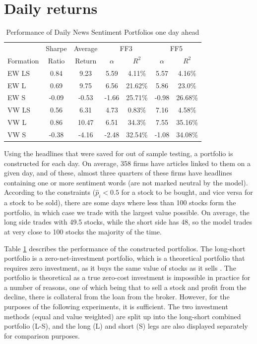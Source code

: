 \section{Daily returns}
\label{sec:daily-returns-analysis}

\begin{table}[!ht]
\begin{center}
\begin{tabular}{lcccccc}
      \toprule
      & Sharpe &  Average & \multicolumn{2}{c}{FF3} & \multicolumn{2}{c}{FF5} \\
      \cmidrule(lr){4-5}
      \cmidrule(lr){6-7}
      Formation & Ratio & Return & $\alpha$ & $R^2$ & $\alpha$ & $R^2$ \\
      \midrule
      EW LS & 0.84 & 9.23 & 5.59 & 4.11\% & 5.57 & 4.16\% \\
      EW L & 0.69 & 9.75 & 6.56 & 21.62\% & 5.86 & 23.0\% \\
      EW S & -0.09 & -0.53 & -1.66 & 25.71\% & -0.98 & 26.68\% \\
      VW LS & 0.56 & 6.31 & 4.73 & 0.83\% & 7.16 & 4.58\% \\
      VW L & 0.86 & 10.47 & 6.51 & 34.3\% & 7.55 & 35.16\% \\
      VW S & -0.38 & -4.16 & -2.48 & 32.54\% & -1.08 & 34.08\% \\
      \bottomrule
\end{tabular}
\caption{Performance of Daily News Sentiment Portfolios one day ahead}
\label{portfolio-performance}
\end{center}
\end{table}

Using the headlines that were saved for out of sample testing, a portfolio is constructed for each day. On average, 358 firms have articles linked to them on a given day, and of these, almost three quarters of these firms have headlines containing one or more sentiment words (are not marked neutral by the model). According to the constraints ($\widehat p_i < 0.5$ for a stock to be bought, and vice versa for a stock to be sold), there are some days where less than 100 stocks form the portfolio, in which case we trade with the largest value possible. On average, the long side trades with 49.5 stocks, while the short side has 48, so the model trades at very close to 100 stocks the majority of the time.

Table \ref{portfolio-performance} describes the performance of the constructed portfolios. The long-short portfolio is a zero-net-investment portfolio, which is a theoretical portfolio that requires zero investment, as it buys the same value of stocks as it sells \parencite{zero-net}. The portfolio is theoretical as a true zero-cost investment is impossible in practice for a number of reasons, one of which being that to sell a stock and profit from the decline, there is collateral from the loan from the broker. However, for the purposes of the following experiments, it is sufficient. The two investment methods (equal and value weighted) are split up into the long-short combined portfolio (L-S), and the long (L) and short (S) legs are also displayed separately for comparison purposes.

